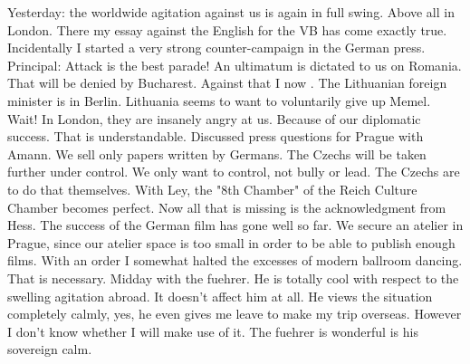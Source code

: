 Yesterday: the worldwide agitation against us is again in full swing. Above all in London. There my essay against the English for the VB has come exactly true. Incidentally I started a very strong counter-campaign in the German press. Principal: Attack is the best parade! An ultimatum is dictated to us on Romania. That will be denied by Bucharest. Against that I now . The Lithuanian foreign minister is in Berlin. Lithuania seems to want to voluntarily give up Memel. Wait! In London, they are insanely angry at us. Because of our diplomatic success. That is understandable. Discussed press questions for Prague with Amann. We sell only papers written by Germans. The Czechs will be taken further under control. We only want to control, not bully or lead. The Czechs are to do that themselves. With Ley, the "8th Chamber" of the Reich Culture Chamber becomes perfect. Now all that is missing is the acknowledgment from Hess. The \missing success of the German film has gone well so far. We secure an atelier in Prague, since our atelier space is too small in order to be able to publish enough films. With an order I somewhat halted the excesses of modern ballroom dancing. That is necessary. Midday with the fuehrer. He is totally cool with respect to the swelling agitation abroad. It doesn't affect him at all. He views the situation completely calmly, yes, he even gives me leave to make my trip overseas. However I don't know whether I will make use of it. The fuehrer is wonderful is his sovereign calm. \missing
